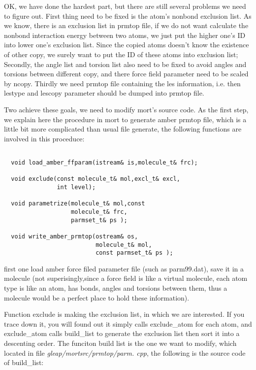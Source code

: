\documentclass[letterpaper]{book}
\begin{document}
OK, we have done the hardest part, but there are still several problems we need to figure out. 
First thing need to be fixed is the atom's nonbond exclusion list. As we know, 
there is an exclusion list in prmtop file, if we do not want calculate the nonbond interaction 
energy between two atoms, we just put the higher one's ID into lower one's exclusion list. Since
the copied atoms doesn't know the existence of other copy, we surely want to put the ID of these
atoms into exclusion list; Secondly, the angle list and torsion list also need to be fixed to 
avoid angles and torsions between different copy, and there force field parameter need to be 
scaled by ncopy. Thirdly we need prmtop file containing the les information, i.e. then lestype 
and lescopy parameter should be dumped into prmtop file.


Two achieve these goals, we need to modify mort's source code. As the first step, we explain 
here the procedure in mort to generate amber prmtop file, which is a little bit more complicated
than usual file generate, the following functions are involved in this proceduce:


\begin{lstlisting}

  void load_amber_ffparam(istream& is,molecule_t& frc);

  void exclude(const molecule_t& mol,excl_t& excl,
               int level);

  void parametrize(molecule_t& mol,const 
                   molecule_t& frc,
                   parmset_t& ps );

  void write_amber_prmtop(ostream& os,
                          molecule_t& mol, 
                          const parmset_t& ps );

\end{lstlisting}

first one load amber force filed parameter file (such as parm99.dat), save it in a molecule 
(not superisingly,since a force field is like a virtual molecule, each atom type is like an 
atom, has bonds, angles and torsions between them, thus a molecule would be a perfect place 
to hold these information).

Function exclude is making the exclusion list, in which we are interested. If you trace down 
it, you will found out it simply calls exclude\_atom for each atom, and exclude\_atom calls 
build\_list to generate the exclusion list then sort it into a descenting order. The funciton 
build list is the one we want to modify, which located in file {\it gleap/mortsrc/prmtop/parm.
cpp}, the following is the source code of build\_list:
\end{document}
